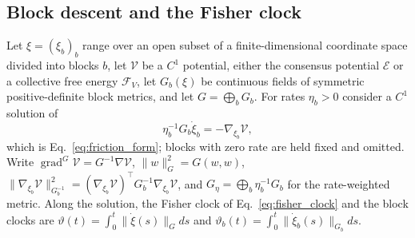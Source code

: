 \subsection{Block descent and the Fisher clock}\label{app:sp_block_descent}
Let $\xi=(\xi_b)_b$ range over an open subset of a finite-dimensional coordinate space divided into blocks $b$, let $\mathcal V$ be a $C^1$ potential, either the consensus potential $\mathcal E$ or a collective free energy $\mathcal F_V$, let $G_b(\xi)$ be continuous fields of symmetric positive-definite block metrics, and let $G=\bigoplus_bG_b$. For rates $\eta_b>0$ consider a $C^1$ solution of
\begin{equation}
\eta_b^{-1}G_b\dot\xi_b=-\nabla_{\xi_b}\mathcal V,
\label{eq:sp_block_flow}
\end{equation}
which is Eq.~\eqref{eq:friction_form}; blocks with zero rate are held fixed and omitted. Write $\operatorname{grad}^G\mathcal V=G^{-1}\nabla\mathcal V$, $\|w\|_G^2=G(w,w)$, $\|\nabla_{\xi_b}\mathcal V\|_{G_b^{-1}}^2=(\nabla_{\xi_b}\mathcal V)^\top G_b^{-1}\nabla_{\xi_b}\mathcal V$, and $G_\eta=\bigoplus_b\eta_b^{-1}G_b$ for the rate-weighted metric. Along the solution, the Fisher clock of Eq.~\eqref{eq:fisher_clock} and the block clocks are
$\vartheta(t)=\int_0^t\|\dot\xi(s)\|_Gds$ and $\vartheta_b(t)=\int_0^t\|\dot\xi_b(s)\|_{G_b}ds$.

